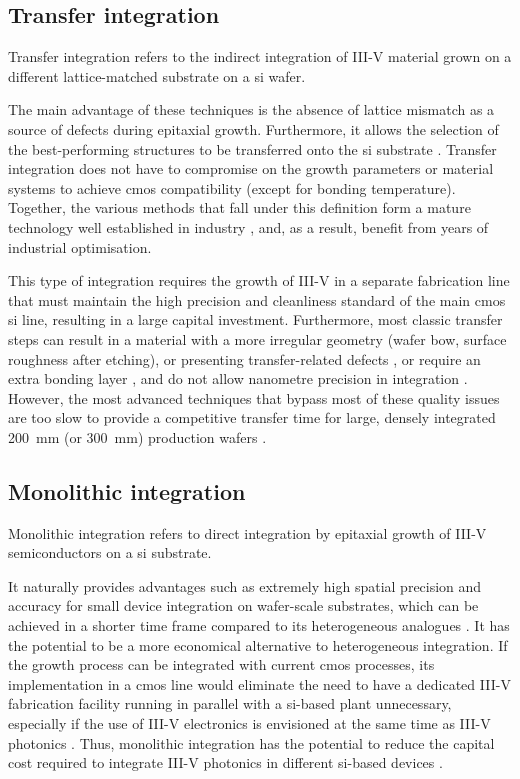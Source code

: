 \subsection{Transfer integration}
Transfer integration refers to the indirect integration of III-V material grown on a different lattice-matched substrate on a \acl{si} wafer. 

The main advantage of these techniques is the absence of lattice mismatch as a source of defects during epitaxial growth. Furthermore, it allows the selection of the best-performing structures to be transferred onto the \acl{si} substrate \cite{Zadeh2016, Wang2017}. Transfer integration does not have to compromise on the growth parameters or material systems to achieve \acs{cmos} compatibility (except for bonding temperature). Together, the various methods that fall under this definition form a mature technology well established in industry \cite{Han2022, Wang2017}, and, as a result, benefit from years of industrial optimisation.

This type of integration requires the growth of III-V in a separate fabrication line that must maintain the high precision and cleanliness standard of the main \acs{cmos} \acl{si} line, resulting in a large capital investment. Furthermore, most classic transfer steps can result in a material with a more irregular geometry (wafer bow, surface roughness after etching), or presenting transfer-related defects \cite{Jevtics2022}, or require an extra bonding layer \cite{Tang2019, Jevtics2022}, and do not allow nanometre precision in integration \cite{McPhillimy2020, Wang2017}. However, the most advanced techniques that bypass most of these quality issues are too slow to provide a competitive transfer time for large, densely integrated \qty{200}{\milli\metre} (or \qty{300}{\milli\metre}) production wafers \cite{McPhillimy2020, Wang2017}.

\subsection{Monolithic integration}

Monolithic integration refers to direct integration by epitaxial growth of III-V semiconductors on a \acl{si} substrate. 

It naturally provides advantages such as extremely high spatial precision and accuracy for small device integration on wafer-scale substrates, which can be achieved in a shorter time frame compared to its heterogeneous analogues \cite{Wang2017}. It has the potential to be a more economical alternative to heterogeneous integration. If the growth process can be integrated with current \acs{cmos} processes, its implementation in a \acs{cmos} line would eliminate the need to have a dedicated III-V fabrication facility running in parallel with a \acl{si}-based plant unnecessary, especially if the use of III-V electronics is envisioned at the same time as III-V photonics \cite{Wang2017}. Thus, monolithic integration has the potential to reduce the capital cost required to integrate III-V photonics in different \acl{si}-based devices \cite{Tang2019}.

